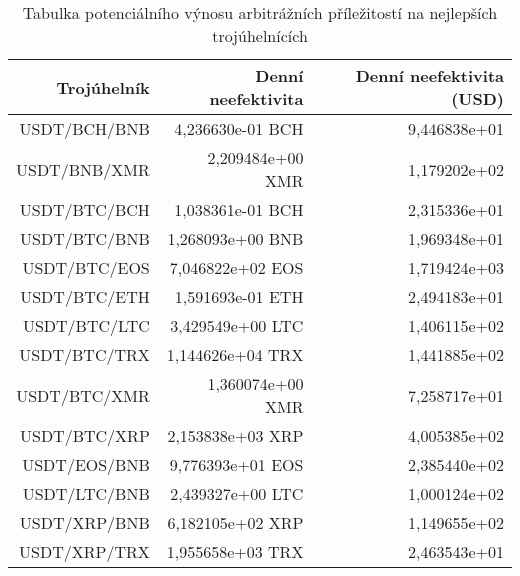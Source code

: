 \begin{table}\centering
\caption{Tabulka potenciálního výnosu arbitrážních příležitostí na nejlepších trojúhelnících}
\label{table_gains_best}
\begin{tabular}{|| r | r | r ||}\hline Trojúhelník & Denní neefektivita & Denní neefektivita (USD)\\ [0.5ex]
 \hline\hline USDT/BCH/BNB & 4,236630e-01 BCH & 9,446838e+01\\ 
 \hline USDT/BNB/XMR & 2,209484e+00 XMR & 1,179202e+02\\ 
 \hline USDT/BTC/BCH & 1,038361e-01 BCH & 2,315336e+01\\ 
 \hline USDT/BTC/BNB & 1,268093e+00 BNB & 1,969348e+01\\ 
 \hline USDT/BTC/EOS & 7,046822e+02 EOS & 1,719424e+03\\ 
 \hline USDT/BTC/ETH & 1,591693e-01 ETH & 2,494183e+01\\ 
 \hline USDT/BTC/LTC & 3,429549e+00 LTC & 1,406115e+02\\ 
 \hline USDT/BTC/TRX & 1,144626e+04 TRX & 1,441885e+02\\ 
 \hline USDT/BTC/XMR & 1,360074e+00 XMR & 7,258717e+01\\ 
 \hline USDT/BTC/XRP & 2,153838e+03 XRP & 4,005385e+02\\ 
 \hline USDT/EOS/BNB & 9,776393e+01 EOS & 2,385440e+02\\ 
 \hline USDT/LTC/BNB & 2,439327e+00 LTC & 1,000124e+02\\ 
 \hline USDT/XRP/BNB & 6,182105e+02 XRP & 1,149655e+02\\ 
 \hline USDT/XRP/TRX & 1,955658e+03 TRX & 2,463543e+01\\ 
 \hline
\end{tabular}
\end{table}